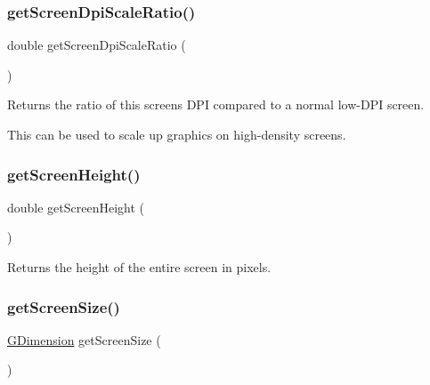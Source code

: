 \subsubsection{\texorpdfstring{get\+Screen\+Dpi\+Scale\+Ratio()}{getScreenDpiScaleRatio()}}
{\footnotesize\ttfamily double get\+Screen\+Dpi\+Scale\+Ratio (\begin{DoxyParamCaption}{ }\end{DoxyParamCaption})\hspace{0.3cm}{\ttfamily [static]}}



Returns the ratio of this screen\textquotesingle{}s D\+PI compared to a normal low-\/\+D\+PI screen. 

This can be used to scale up graphics on high-\/density screens. \mbox{\label{classsgl_1_1GWindow_a9942379fdf4fb4445c35eaf3390b7ccb}} 
\subsubsection{\texorpdfstring{get\+Screen\+Height()}{getScreenHeight()}}
{\footnotesize\ttfamily double get\+Screen\+Height (\begin{DoxyParamCaption}{ }\end{DoxyParamCaption})\hspace{0.3cm}{\ttfamily [static]}}



Returns the height of the entire screen in pixels. 

\mbox{\label{classsgl_1_1GWindow_ae3d08d5cde8163274459797770596809}} 
\subsubsection{\texorpdfstring{get\+Screen\+Size()}{getScreenSize()}}
{\footnotesize\ttfamily \mbox{\hyperlink{structsgl_1_1GDimension}{G\+Dimension}} get\+Screen\+Size (\begin{DoxyParamCaption}{ }\end{DoxyParamCaption})\hspace{0.3cm}{\ttfamily [static]}}



